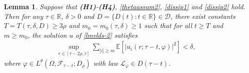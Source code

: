 \documentclass[11pt]{article}
\numberwithin{equation}{section}
\theoremstyle{plain}
\newtheorem{lemma}{Lemma}[section]
\begin{document}
\begin{lemma}\label{upte}
   Suppose that {\bf(H1)}-{\bf(H4)}, \eqref{thetaassum2}, \eqref{dissip1} and \eqref{dissip2} hold.
   Then for any $\tau \in \mathbb{R}$, $\delta > 0$ and $D = \{D(t): t \in \mathbb{R} \} \in \mathcal{D}$,
   there exist constants $T = T(\tau, \delta, D)  \ge { 3}\rho$ 
   and $m_0 = m_0(\tau, \delta) \ge 1$
   such that for all $t \ge T$ and $m \ge m_0$, the solution $u$ of \eqref{lmvlds-2} satisfies
   \begin{align*}
      \sup_{r \in [\tau-2\rho, \tau]} \sum_{|i| \ge m}
            \mathbb{E} \left[ |u_i(r; \tau-t, \varphi)|^2 \right]
      < \delta,
   \end{align*}
   where $\varphi \in L^\theta(\Omega, \mathcal{F}_{\tau-t}; D_{\rho})$ with law $\mathcal{L}_{\varphi} \in D(\tau-t)$.
\end{lemma}
\end{document}
